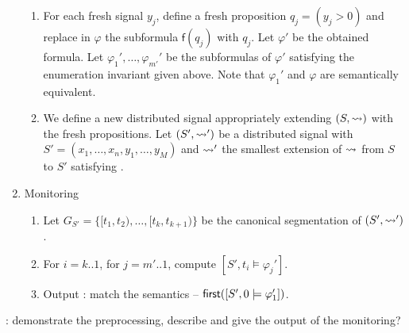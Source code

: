 \begin{enumerate}
\begin{enumerate}[label=\arabic*.]
		
		\item
		For each fresh signal $y_j$, define a fresh proposition $q_j = (y_j > 0)$ and replace in $\varphi$ the subformula $\mathsf{f}(q_j)$ with $q_j$.
		Let $\varphi'$ be the obtained formula.
		Let $\varphi_1', \ldots, \varphi_{m'}'$ be the subformulas of $\varphi'$ satisfying the enumeration invariant given above.
		Note that $\varphi_1'$  and $\varphi$ are semantically equivalent. %
		
		\item
		We define a new distributed signal appropriately extending $(S,{\rightsquigarrow})$ with the fresh propositions.
		Let $(S', {\rightsquigarrow}')$ be a distributed signal with $S' = (x_1, \ldots, x_n, y_1, \ldots, y_M)$ and ${\rightsquigarrow}'$ the smallest extension of ${\rightsquigarrow}$ from $S$ to $S'$ satisfying . 
		
	\end{enumerate}

	\item Monitoring
	\begin{enumerate}[label=\arabic*.]
		\item
		Let $G_{S'} = \{ [t_1, t_2), \ldots, [t_k, t_{k+1}) \}$ be the canonical segmentation of $(S', {\rightsquigarrow}')$.
		
		\item
		For $i = k .. 1$, for $j = m' .. 1$, compute $[S', t_i \models \varphi_j']$.
		
		\item
		Output \TODO: match the semantics -- \alert{$\textsf{first}([S',0 \models \varphi_1'])$}.
	\end{enumerate}
\end{enumerate}

\begin{example}
	\TODO: demonstrate the preprocessing, describe and give the output of the monitoring? 
\end{example}

